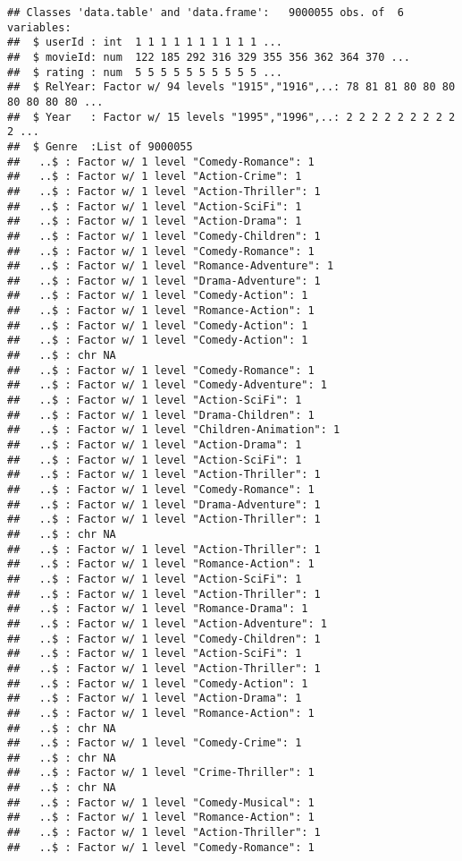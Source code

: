 \documentclass[
]{article}
\begin{document}
\begin{verbatim}
## Classes 'data.table' and 'data.frame':   9000055 obs. of  6 variables:
##  $ userId : int  1 1 1 1 1 1 1 1 1 1 ...
##  $ movieId: num  122 185 292 316 329 355 356 362 364 370 ...
##  $ rating : num  5 5 5 5 5 5 5 5 5 5 ...
##  $ RelYear: Factor w/ 94 levels "1915","1916",..: 78 81 81 80 80 80 80 80 80 80 ...
##  $ Year   : Factor w/ 15 levels "1995","1996",..: 2 2 2 2 2 2 2 2 2 2 ...
##  $ Genre  :List of 9000055
##   ..$ : Factor w/ 1 level "Comedy-Romance": 1
##   ..$ : Factor w/ 1 level "Action-Crime": 1
##   ..$ : Factor w/ 1 level "Action-Thriller": 1
##   ..$ : Factor w/ 1 level "Action-SciFi": 1
##   ..$ : Factor w/ 1 level "Action-Drama": 1
##   ..$ : Factor w/ 1 level "Comedy-Children": 1
##   ..$ : Factor w/ 1 level "Comedy-Romance": 1
##   ..$ : Factor w/ 1 level "Romance-Adventure": 1
##   ..$ : Factor w/ 1 level "Drama-Adventure": 1
##   ..$ : Factor w/ 1 level "Comedy-Action": 1
##   ..$ : Factor w/ 1 level "Romance-Action": 1
##   ..$ : Factor w/ 1 level "Comedy-Action": 1
##   ..$ : Factor w/ 1 level "Comedy-Action": 1
##   ..$ : chr NA
##   ..$ : Factor w/ 1 level "Comedy-Romance": 1
##   ..$ : Factor w/ 1 level "Comedy-Adventure": 1
##   ..$ : Factor w/ 1 level "Action-SciFi": 1
##   ..$ : Factor w/ 1 level "Drama-Children": 1
##   ..$ : Factor w/ 1 level "Children-Animation": 1
##   ..$ : Factor w/ 1 level "Action-Drama": 1
##   ..$ : Factor w/ 1 level "Action-SciFi": 1
##   ..$ : Factor w/ 1 level "Action-Thriller": 1
##   ..$ : Factor w/ 1 level "Comedy-Romance": 1
##   ..$ : Factor w/ 1 level "Drama-Adventure": 1
##   ..$ : Factor w/ 1 level "Action-Thriller": 1
##   ..$ : chr NA
##   ..$ : Factor w/ 1 level "Action-Thriller": 1
##   ..$ : Factor w/ 1 level "Romance-Action": 1
##   ..$ : Factor w/ 1 level "Action-SciFi": 1
##   ..$ : Factor w/ 1 level "Action-Thriller": 1
##   ..$ : Factor w/ 1 level "Romance-Drama": 1
##   ..$ : Factor w/ 1 level "Action-Adventure": 1
##   ..$ : Factor w/ 1 level "Comedy-Children": 1
##   ..$ : Factor w/ 1 level "Action-SciFi": 1
##   ..$ : Factor w/ 1 level "Action-Thriller": 1
##   ..$ : Factor w/ 1 level "Comedy-Action": 1
##   ..$ : Factor w/ 1 level "Action-Drama": 1
##   ..$ : Factor w/ 1 level "Romance-Action": 1
##   ..$ : chr NA
##   ..$ : Factor w/ 1 level "Comedy-Crime": 1
##   ..$ : chr NA
##   ..$ : Factor w/ 1 level "Crime-Thriller": 1
##   ..$ : chr NA
##   ..$ : Factor w/ 1 level "Comedy-Musical": 1
##   ..$ : Factor w/ 1 level "Romance-Action": 1
##   ..$ : Factor w/ 1 level "Action-Thriller": 1
##   ..$ : Factor w/ 1 level "Comedy-Romance": 1

\end{verbatim}
\end{document}
